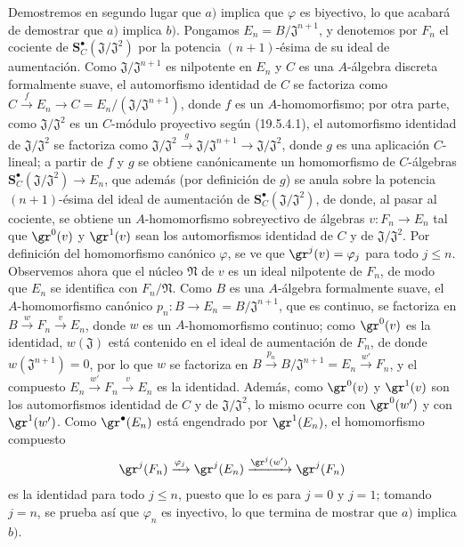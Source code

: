 \begin{env}[19.5.4.2]
\label{0.19.5.4.2-fr}
Demostremos en segundo lugar que $a)$ implica que $\varphi$ es biyectivo, lo que
acabará de demostrar que $a)$ implica $b)$. Pongamos
$E_n=B/\mathfrak J^{n+1}$, y denotemos por $F_n$ el cociente de
$\mathbf S_C^\bullet(\mathfrak J/\mathfrak J^2)$ por la potencia $(n+1)$-ésima de
su ideal de aumentación. Como $\mathfrak J/\mathfrak J^{n+1}$ es nilpotente
en $E_n$ y $C$ es una $A$-álgebra discreta formalmente suave,
el automorfismo identidad de $C$ se factoriza como
$C\xrightarrow{f}E_n\to C=E_n/(\mathfrak J/\mathfrak J^{n+1})$, donde $f$ es un
$A$-homomorfismo; por otra parte, como $\mathfrak J/\mathfrak J^2$ es un
$C$-módulo proyectivo según (19.5.4.1), el automorfismo identidad de
$\mathfrak J/\mathfrak J^2$ se factoriza como
$\mathfrak J/\mathfrak J^2\xrightarrow{g}\mathfrak J/\mathfrak J^{n+1}
\to\mathfrak J/\mathfrak J^2$, donde $g$ es una aplicación $C$-lineal; a
partir de $f$ y $g$ se obtiene canónicamente un homomorfismo de $C$-álgebras
$\mathbf S_C^\bullet(\mathfrak J/\mathfrak J^2)\to E_n$, que además (por
definición de $g$) se anula sobre la potencia $(n+1)$-ésima del ideal
de aumentación de $\mathbf S_C^\bullet(\mathfrak J/\mathfrak J^2)$, de donde, al
pasar al cociente, se obtiene un $A$-homomorfismo sobreyectivo de álgebras
$v:F_n\to E_n$ tal que $\gr^0(v)$ y $\gr^1(v)$ sean los automorfismos
identidad de $C$ y de $\mathfrak J/\mathfrak J^2$. Por definición del
homomorfismo canónico $\varphi$, se ve que $\gr^j(v)=\varphi_j$ para todo
$j\leq n$. Observemos ahora que el núcleo $\mathfrak N$ de $v$ es un ideal
nilpotente de $F_n$, de modo que $E_n$ se identifica con $F_n/\mathfrak N$. Como
$B$ es una $A$-álgebra formalmente suave, el $A$-homomorfismo canónico
$p_n:B\to E_n=B/\mathfrak J^{n+1}$, que es continuo, se factoriza en
$B\xrightarrow{w}F_n\xrightarrow{v}E_n$, donde $w$ es un $A$-homomorfismo
continuo; como $\gr^0(v)$ es la identidad, $w(\mathfrak J)$ está contenido en
el ideal de aumentación de $F_n$, de donde $w(\mathfrak J^{n+1})=0$, por lo que
$w$ se factoriza en
$B\xrightarrow{p_n}B/\mathfrak J^{n+1}=E_n\xrightarrow{w'}F_n$, y el compuesto
$E_n\xrightarrow{w'}F_n\xrightarrow{v}E_n$ es la identidad. Además, como
$\gr^0(v)$ y $\gr^1(v)$ son los automorfismos identidad de $C$ y de
$\mathfrak J/\mathfrak J^2$, lo mismo ocurre con $\gr^0(w')$ y con
$\gr^1(w')$. Como $\gr^\bullet(E_n)$ está engendrado por $\gr^1(E_n)$, el
homomorfismo compuesto
\[
  \gr^j(F_n)\xrightarrow{\varphi_j}\gr^j(E_n)
  \xrightarrow{\gr^j(w')}\gr^j(F_n)
\]
es la identidad para todo $j\leq n$, puesto que lo es para $j=0$ y $j=1$;
tomando $j=n$, se prueba así que $\varphi_n$ es inyectivo, lo que termina de
mostrar que $a)$ implica $b)$.
\end{env}


